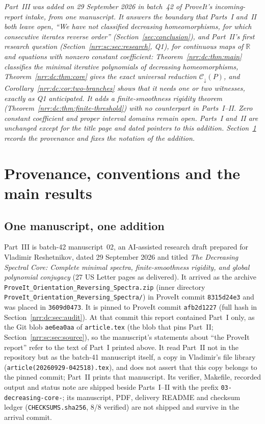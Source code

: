\documentclass[11pt,letterpaper]{article}
\theoremstyle{definition}
\theoremstyle{remark}
\newcommand{\R}{\mathbb R}
\newcommand{\dcore}{\mathcal C_{\downarrow}}
\begin{document}
\noindent\emph{Part~III was added on 29 September 2026 in batch~42 of
ProveIt's incoming-report intake, from one manuscript. It answers the boundary
that Parts~I and~II both leave open, ``We have not classified decreasing
homeomorphisms, for which consecutive iterates reverse order''
(Section~\ref{sec:conclusion}), and Part~II's first research question
(Section~\ref{nrr:sc:sec:research}, Q1), for continuous maps of $\R$ and
equations with nonzero constant coefficient:
Theorem~\ref{nrr:dc:thm:main} classifies the minimal iterative polynomials of
decreasing homeomorphisms, Theorem~\ref{nrr:dc:thm:core} gives the exact
universal reduction $\dcore(P)$, and Corollary~\ref{nrr:dc:cor:two-branches}
shows that it needs one or two witnesses, exactly as Q1 anticipated. It adds a
finite-smoothness rigidity theorem (Theorem~\ref{nrr:dc:thm:finite-threshold})
with no counterpart in Parts~I--II. Zero constant coefficient and proper
interval domains remain open. Parts~I and~II are unchanged except for the title
page and dated pointers to this addition.
Section~\ref{nrr:dc:sec:intro} records the provenance and fixes the notation
of the addition.}

\section{Provenance, conventions and the main results}
\label{nrr:dc:sec:intro}

\subsection{One manuscript, one addition}
\label{nrr:dc:sec:source}

Part~III is batch-42 manuscript~02, an AI-assisted research draft prepared
for Vladimir Reshetnikov, dated 29 September 2026 and titled \emph{The
Decreasing Spectral Core: Complete minimal spectra, finite-smoothness
rigidity, and global polynomial conjugacy} (27 US Letter pages as
delivered). It arrived as
the archive \texttt{ProveIt\_Orientation\_Reversing\_Spectra.zip} (inner
directory \texttt{ProveIt\_Orientation\_Reversing\_Spectra/}) in ProveIt
commit \texttt{8315d24e3} and was placed in \texttt{3609d0473}. It is pinned
to ProveIt commit \texttt{afb2d1227} (full hash in
Section~\ref{nrr:dc:sec:audit}). At that commit this report contained Part~I
only, as the Git blob \texttt{ae6ea0aa} of \texttt{article.tex} (the blob that
pins Part~II; Section~\ref{nrr:sc:sec:source}), so
the manuscript's statements about ``the ProveIt report'' refer to the text of
Part~I printed above. It read Part~II not in the repository but as the
batch-41 manuscript itself, a copy in Vladimir's file library
(\nolinkurl{article(20260929-042518).tex}), and does not assert that this copy
belongs to the pinned commit; Part~II prints that manuscript. Its verifier,
Makefile, recorded output and status note are shipped beside Parts~I--II with
the prefix \nolinkurl{03-decreasing-core-}; its manuscript, PDF, delivery
README and checksum ledger (\texttt{CHECKSUMS.sha256}, 8/8 verified) are not
shipped and survive in the arrival commit.
\end{document}
